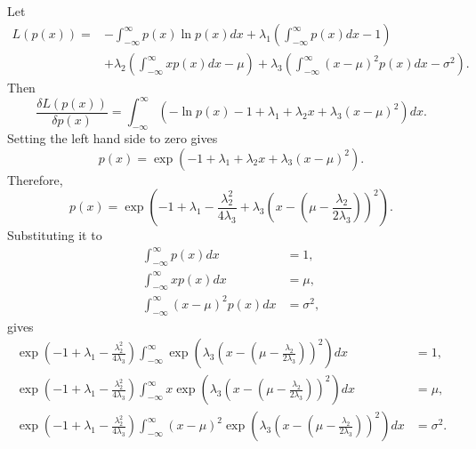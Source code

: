 \subsection{}
\label{1.34}
Let
%
\begin{equation}
\begin{aligned}
L(p(x)) = &- \int_{- \infty}^{\infty} p(x) \ln p(x) dx + \lambda_1 \left( \int_{- \infty}^{\infty} p(x) dx - 1 \right) \\
&+ \lambda_2 \left( \int_{- \infty}^{\infty} x p(x) dx - \mu \right) + \lambda_3 \left( \int_{-\infty}^{\infty} (x - \mu) ^ 2 p(x) dx - \sigma ^ 2 \right).
\end{aligned}
\end{equation}
%
Then
%
\begin{equation}
\frac{\delta L(p(x))}{\delta p(x)} = \int_{- \infty}^{\infty} \left( - \ln p(x) - 1 + \lambda_1 + \lambda_2 x + \lambda_3 (x - \mu) ^ 2 \right) dx.
\end{equation}
%
Setting the left hand side to zero gives
%
\begin{equation}
p(x) = \exp \left( - 1 + \lambda_1 + \lambda_2 x + \lambda_3 (x - \mu) ^ 2 \right).
\end{equation}
%
Therefore,
%
\begin{equation}
p(x) = \exp \left( - 1 + \lambda_1 - \frac{\lambda_2 ^ 2}{4 \lambda_3} + \lambda_3 \left( x - \left( \mu - \frac{\lambda_2}{2 \lambda_3} \right) \right) ^ 2 \right).
\end{equation}
%
Substituting it to 
%
\begin{equation}
\begin{aligned}
\int_{- \infty}^{\infty} p(x) dx &= 1, \\
\int_{- \infty}^{\infty} x p(x) dx &= \mu, \\
\int_{- \infty}^{\infty} (x - \mu) ^ 2 p(x) dx &= \sigma ^ 2,
\end{aligned}
\end{equation}
%
gives
%
\begin{equation}
\begin{aligned}
\exp \left( - 1 + \lambda_1 - \frac{\lambda_2 ^ 2}{4 \lambda_3} \right) \int_{- \infty}^{\infty} \exp \left( \lambda_3 \left( x - \left( \mu - \frac{\lambda_2}{2 \lambda_3} \right) \right) ^ 2 \right) dx &= 1, \\
\exp \left( - 1 + \lambda_1 - \frac{\lambda_2 ^ 2}{4 \lambda_3} \right) \int_{- \infty}^{\infty} x \exp \left( \lambda_3 \left( x - \left( \mu - \frac{\lambda_2}{2 \lambda_3} \right) \right) ^ 2 \right) dx &= \mu, \\
\exp \left( - 1 + \lambda_1 - \frac{\lambda_2 ^ 2}{4 \lambda_3} \right) \int_{- \infty}^{\infty} (x - \mu) ^ 2 \exp \left( \lambda_3 \left( x - \left( \mu - \frac{\lambda_2}{2 \lambda_3} \right) \right) ^ 2 \right) dx &= \sigma ^ 2.
\end{aligned}
\end{equation}
